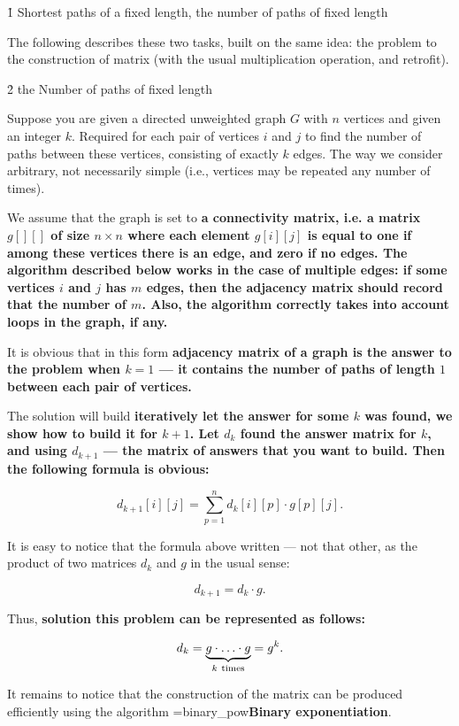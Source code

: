 \h1{ Shortest paths of a fixed length, the number of paths of fixed length }

The following describes these two tasks, built on the same idea: the problem to the construction of matrix (with the usual multiplication operation, and retrofit).


\h2{ the Number of paths of fixed length }

Suppose you are given a directed unweighted graph $G$ with $n$ vertices and given an integer $k$. Required for each pair of vertices $i$ and $j$ to find the number of paths between these vertices, consisting of exactly $k$ edges. The way we consider arbitrary, not necessarily simple (i.e., vertices may be repeated any number of times).

We assume that the graph is set to \bf{a connectivity matrix}, i.e. a matrix $g[][]$ of size $n \times n$ where each element $g[i][j]$ is equal to one if among these vertices there is an edge, and zero if no edges. The algorithm described below works in the case of multiple edges: if some vertices $i$ and $j$ has $m$ edges, then the adjacency matrix should record that the number of $m$. Also, the algorithm correctly takes into account loops in the graph, if any.

It is obvious that in this form \bf{adjacency matrix} of a graph is \bf{the answer to the problem when $k=1$} --- it contains the number of paths of length $1$ between each pair of vertices.

The solution will build \bf{iteratively} let the answer for some $k$ was found, we show how to build it for $k+1$. Let $d_k$ found the answer matrix for $k$, and using $d_{k+1}$ --- the matrix of answers that you want to build. Then the following formula is obvious:

$$ d_{k+1}[i][j] = \sum_{p = 1}^{n} d_k[i][p] \cdot g[p][j]. $$

It is easy to notice that the formula above written --- not that other, as the product of two matrices $d_k$ and $g$ in the usual sense:

$$ d_{k+1} = d_k \cdot g. $$

Thus, \bf{solution} this problem can be represented as follows:

$$ d_k = \underbrace{ g \cdot \ldots \cdot g}_{k\ {\rm times}} = g^k. $$

It remains to notice that the construction of the matrix can be produced efficiently using the algorithm \algohref=binary_pow{\bf{Binary exponentiation}}.

